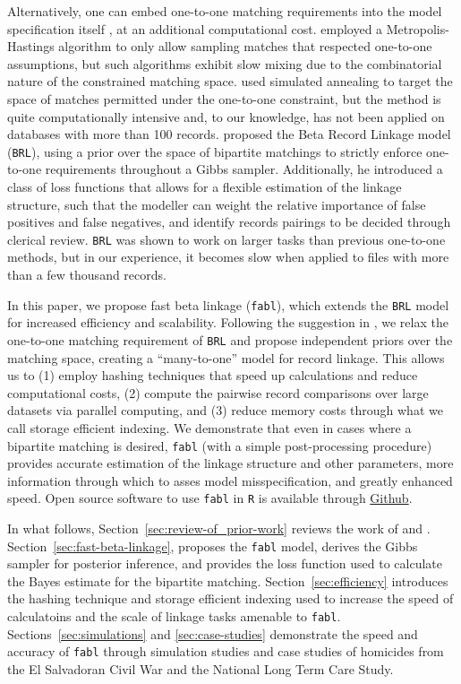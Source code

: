 \documentclass[ba]{imsart}
\begin{document}
Alternatively, one can embed one-to-one matching requirements into the model specification itself \citep{gutman2013bayesian, liseo_2011}, at an additional computational cost. \cite{Larsen05} employed a Metropolis-Hastings algorithm to only allow sampling matches that respected one-to-one assumptions, but such algorithms exhibit slow mixing due to the combinatorial nature of the constrained matching space. \cite{fortunato_2010} used simulated annealing to target the space of matches permitted under the one-to-one constraint, but the method is quite computationally intensive and, to our knowledge, has not been applied on databases with more than 100 records. \cite{sadinle_bayesian_2017} proposed the Beta Record Linkage model (\texttt{BRL}), using a prior over the space of bipartite matchings to strictly enforce one-to-one requirements throughout a Gibbs sampler. Additionally, he introduced a class of loss functions that allows for a flexible estimation of the linkage structure, such that the modeller can weight the relative importance of false positives and false negatives, and identify records pairings to be decided through clerical review. \texttt{BRL} was shown to work on larger tasks than previous one-to-one methods, but in our experience, it becomes slow when applied to files with more than a few thousand records. 

In this paper, we propose fast beta linkage (\texttt{fabl}), which extends the \texttt{BRL} model for increased efficiency and scalability. Following the suggestion in \cite{wortman2019}, we relax the one-to-one matching requirement of \texttt{BRL} and propose independent priors over the matching space, creating a ``many-to-one'' model for record linkage. This allows us to (1) employ hashing techniques that speed up calculations and reduce computational costs, (2) compute the pairwise record comparisons over large datasets via parallel computing, and (3) reduce memory costs through what we call storage efficient indexing. We demonstrate that even in cases where a bipartite matching is desired, \texttt{fabl} (with a simple post-processing procedure) provides accurate estimation of the linkage structure and other parameters, more information through which to asses model misspecification, and greatly enhanced speed. Open source software to use \texttt{fabl} in \texttt{R} is available through \href{https://github.com/briankundinger/parlrdev}{Github}.

In what follows, Section~\ref{sec:review-of_prior-work} reviews the work of \cite{fellegi_theory_1969} and \cite{sadinle_bayesian_2017}. Section~\ref{sec:fast-beta-linkage}, proposes the \texttt{fabl} model, derives the Gibbs sampler for posterior inference, and provides the loss function used to calculate the Bayes estimate for the bipartite matching. Section~\ref{sec:efficiency} introduces the hashing technique and storage efficient indexing used to increase the speed of calculatoins and the scale of linkage tasks amenable to \texttt{fabl}. Sections~\ref{sec:simulations} and \ref{sec:case-studies} demonstrate the speed and accuracy of \texttt{fabl} through simulation studies and case studies of homicides from the El Salvadoran Civil War and the National Long Term Care Study.
\end{document}
